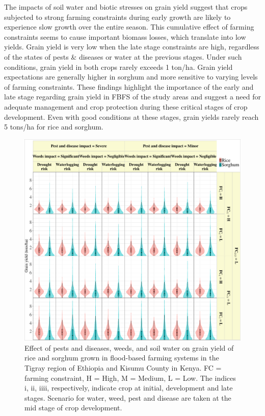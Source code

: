 \documentclass[]{elsarticle} %
\begin{document}
The impacts of soil water and biotic stresses on grain yield suggest that crops subjected to strong farming constraints during early growth are likely to experience slow growth over the entire season. This cumulative effect of farming constraints seems to cause important biomass losses, which translate into low yields. Grain yield is very low when the late stage constraints are high, regardless of the states of pests \& diseases or water at the previous stages. Under such conditions, grain yield in both crops rarely exceeds 1 ton/ha. Grain yield expectations are generally higher in sorghum and more sensitive to varying levels of farming constraints. These findings highlight the importance of the early and late stage regarding grain yield in FBFS of the study areas and suggest a need for adequate management and crop protection during these critical stages of crop development. Even with good conditions at these stages, grain yields rarely reach 5 tons/ha for rice and sorghum.

\begin{figure}[!h]

{\centering \includegraphics[width=1\linewidth,]{figures/Modelling_FBFS_grain_yield_violin_LOW} 

}

\caption{Effect of pests and diseases, weeds, and soil water on grain yield of rice and sorghum grown in flood-based farming systems in the Tigray region of Ethiopia and Kisumu County in Kenya. FC = farming constraint, H = High, M = Medium, L = Low. The indices i, ii, iiii, respectively, indicate crop at initial, development and late stages. Scenario for water, weed, pest and disease are taken at the mid stage of crop development. }\label{fig:fig10}
\end{figure}
\end{document}
